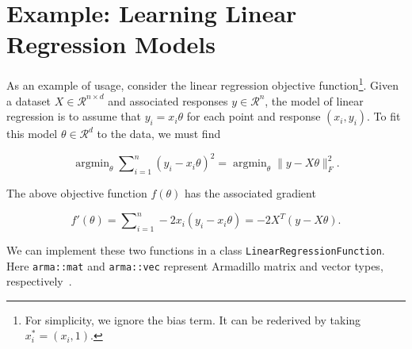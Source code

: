 \documentclass{article}
\begin{document}
\vspace*{-0.3em}
\section{Example: Learning Linear Regression Models}
\vspace*{-0.5em}

As an example of usage, consider the linear regression objective
function\footnote{For simplicity, we ignore the bias term.  It can be
rederived by taking $x^*_i = (x_i, 1)$.}.  Given a dataset $X \in
\mathcal{R}^{n \times d}$ and associated responses $y \in \mathcal{R}^n$, the
model of linear regression is to assume that $y_i = x_i \theta$ for each
point and response $(x_i, y_i)$.  To fit this model $\theta \in \mathcal{R}^d$
to the data, we must find

\vspace*{-1.1em}
\begin{equation}
\operatorname{argmin}_\theta \sum\nolimits_{i = 1}^n (y_i - x_i \theta)^2 =
\operatorname{argmin}_\theta \| y - X \theta \|_F^2.
\end{equation}
\vspace*{-1.1em}

The above objective function $f(\theta)$ has the associated gradient

\vspace*{-1.1em}
\begin{equation}
f'(\theta) = \sum\nolimits_{i = 1}^n -2 x_i (y_i - x_i \theta) = -2 X^T (y - X \theta).
\end{equation}
\vspace*{-1.1em}

We can implement these two functions in a class {\tt LinearRegressionFunction}.
Here {\tt arma::mat} and {\tt arma::vec} represent Armadillo matrix and vector
types, respectively~\cite{sanderson2016armadillo}.

\end{document}
